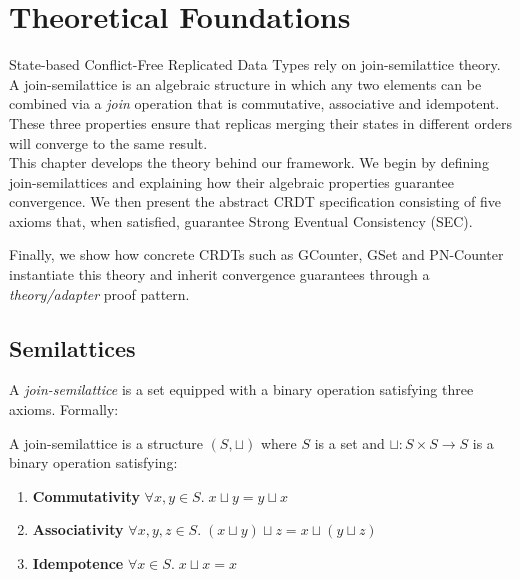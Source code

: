 
\chapter{Theoretical Foundations}\label{chap:theory}

State-based Conflict-Free Replicated Data Types rely on join-semilattice theory. A join-semilattice is an algebraic structure in which any two elements can be combined via a \emph{join} operation that is commutative, associative and idempotent. These three properties ensure that replicas merging their states in different orders will converge to the same result.\\

This chapter develops the theory behind our framework. We begin by defining join-semilattices and explaining how their algebraic properties guarantee convergence. We then present the abstract CRDT specification consisting of five axioms that, when satisfied, guarantee Strong Eventual Consistency (SEC). 

Finally, we show how concrete CRDTs such as GCounter, GSet and PN-Counter instantiate this theory and inherit convergence guarantees through a \emph{theory/adapter} proof pattern.


\section{Semilattices}

A \emph{join-semilattice} is a set equipped with a binary operation satisfying three axioms. Formally:

\begin{definition}
A join-semilattice is a structure $(S, \sqcup)$ where $S$ is a set and $\sqcup: S \times S \to S$ is a binary operation satisfying:
\begin{enumerate}
  \item \textbf{Commutativity} {$\forall x, y \in S. \; x \sqcup y = y \sqcup x$}
  \item \textbf{Associativity} {$\forall x, y, z \in S. \; (x \sqcup y) \sqcup z = x \sqcup (y \sqcup z)$}
  \item \textbf{Idempotence} {$\forall x \in S. \; x \sqcup x = x$}
\end{enumerate}
\end{definition}

\vspace{0.5cm}


